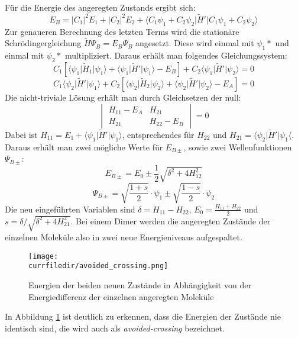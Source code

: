 Für die Energie des angeregten Zustands ergibt sich:
\begin{equation}
    E_B = \lvert C_1\rvert^2 E_1 + \lvert C_2\rvert^2 E_2 + \langle C_1\psi_1 + C_2\psi_2\lvert\tilde{H}'\rvert C_1\psi_1 + C_2\psi_2\rangle
\end{equation}
Zur genaueren Berechnung des letzten Terms wird die stationäre Schrödingergleichung $\tilde{H}\Psi_B = E_B\Psi_B$ angesetzt. Diese wird einmal mit $\psi_1*$ und einmal mit $\psi_2*$ multipliziert. Daraus erhält man folgendes Gleichungssystem:
\[ C_1 \left[\langle\psi_1\lvert\tilde{H}_1\rvert\psi_1\rangle+\langle\psi_1\lvert\tilde{H}'\rvert\psi_1\rangle - E_B\right] + C_2\langle\psi_1\lvert\tilde{H}'\rvert\psi_2\rangle = 0 \]
\[ C_1\langle\psi_2\lvert\tilde{H}'\rvert\psi_1\rangle + C_2 \left[\langle\psi_2\lvert\tilde{H}_2\rvert\psi_2\rangle+\langle\psi_2\lvert\tilde{H}'\rvert\psi_2\rangle - E_A\right] = 0 \]
Die nicht-triviale Lösung erhält man durch Gleichsetzen der null:
\[ \begin{vmatrix}
    H_{11} - E_A & H_{21} \\
    H_{21} & H_{22} - E_B
   \end{vmatrix} = 0 \] 
Dabei ist $H_{11}=E_1+\langle\psi_1\lvert\tilde{H}'\rvert\psi_1\rangle$, entsprechendes für $H_{22}$ und $H_{21}=\langle\psi_2\lvert\tilde{H}'\rvert\psi_1\langle$. Daraus erhält man zwei mögliche Werte für $E_{B\pm}$, sowie zwei Wellenfunktionen $\Psi_{B\pm}$:
\begin{equation}
    E_{B\pm} = E_0 \pm \frac{1}{2}\sqrt{\delta^2 + 4H_{12}^2}  
\end{equation}
\begin{equation}
    \Psi_{B\pm} = \sqrt{\frac{1+s}{2}}\cdot\psi_1 \pm \sqrt{\frac{1-s}{2}}\cdot\psi_2
\end{equation}
Die neu eingeführten Variablen sind $\delta = H_{11}-H_{22}$, $E_0 = \frac{H_{11}+H_{22}}{2}$ und $s = \delta/\sqrt{\delta^2+4H_{21}^2}$. Bei einem Dimer werden die angeregten Zustände der einzelnen Moleküle also in zwei neue Energieniveaus aufgespaltet.
\begin{figure}
    \centering
    \texttt{[image: \\currfiledir/avoided\_crossing.png]}
    \caption{Energien der beiden neuen Zustände in Abhängigkeit von der Energiedifferenz der einzelnen angeregten Moleküle}
    \label{avoided_crossing}
\end{figure}
In Abbildung \ref{avoided_crossing} ist deutlich zu erkennen, dass die Energien der Zustände nie identisch sind, die wird auch als \textit{avoided-crossing} bezeichnet.


